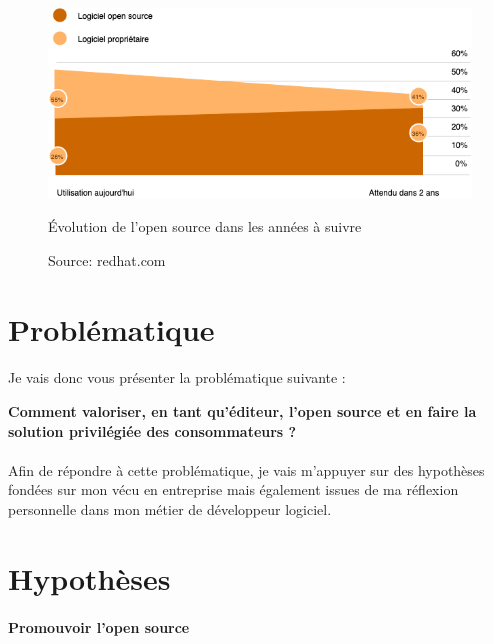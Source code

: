 					\begin{figure}[h]
						\center
						\includegraphics[scale=0.60]{./img/osinentreprise.png}
						\caption{Évolution de l'open source dans les années à suivre}
						\caption*{\color{silver}Source: redhat.com}					
					\end{figure}
					\clearpage

	\section{Problématique}
		\paragraph*{}

			Je vais donc vous présenter la problématique suivante :
			\begin{center}
				\begin{displayquote}
					\textbf{Comment valoriser, en tant qu'éditeur, l'open source et en faire la solution privilégiée des consommateurs ?}
				\end{displayquote}
			\end{center}

		\paragraph*{}
			
			Afin de répondre à cette problématique, je vais m'appuyer sur des hypothèses fondées sur mon vécu en entreprise mais également issues de ma réflexion personnelle dans mon métier de développeur logiciel.

	\section{Hypothèses}

		\paragraph{Promouvoir l'open source\\}

